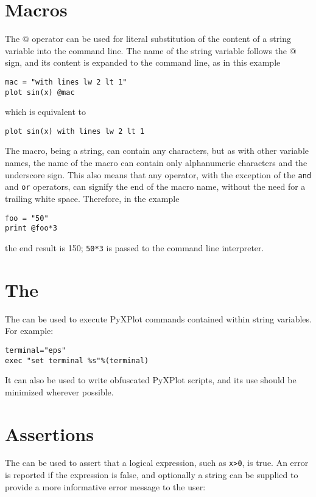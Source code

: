 \section{Macros}

The $@$ operator can be used for literal substitution of the content of a
string variable into the command line.  The name of the string variable follows
the $@$ sign, and its content is expanded to the command line, as in this
example
\begin{verbatim}
mac = "with lines lw 2 lt 1"
plot sin(x) @mac
\end{verbatim}
which is equivalent to 
\begin{verbatim}
plot sin(x) with lines lw 2 lt 1
\end{verbatim}

The macro, being a string, can contain any characters, but as with other
variable names, the name of the macro can contain only alphanumeric characters
and the underscore sign. This also means that any operator, with the exception
of the {\tt and} and {\tt or} operators, can signify the end of the macro name,
without the need for a trailing white space. Therefore, in the example
\begin{verbatim}
foo = "50"
print @foo*3
\end{verbatim}
the end result is 150; {\tt 50*3} is passed to the command line interpreter.

\section{The }

The  can be used to execute PyXPlot commands contained within
string variables. For example:

\begin{verbatim}
terminal="eps"
exec "set terminal %s"%(terminal)
\end{verbatim}

\noindent It can also be used to write obfuscated PyXPlot scripts, and its use
should be minimized wherever possible.

\section{Assertions}

The  can be used to assert that a logical expression, such as
{\tt x>0}, is true. An error is reported if the expression is false, and
optionally a string can be supplied to provide a more informative error message
to the user:


